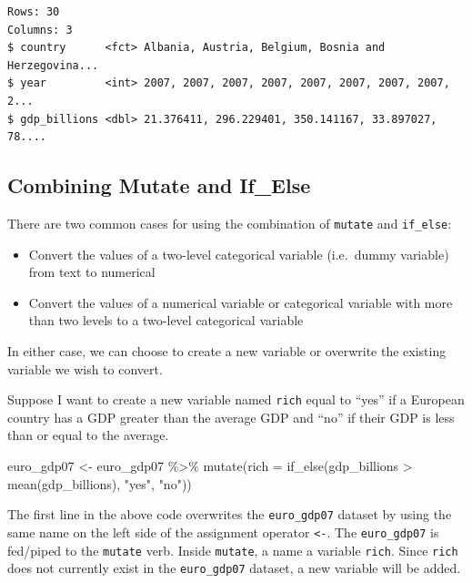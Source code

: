 \documentclass[
]{book}
\makeatletter
\newenvironment{Shaded}{\begin{snugshade}}{\end{snugshade}}
\newcommand{\AttributeTok}[1]{\textcolor[rgb]{0.61,0.61,0.61}{#1}}
\newcommand{\FunctionTok}[1]{\textcolor[rgb]{0,0,0}{#1}}
\newcommand{\NormalTok}[1]{#1}
\newcommand{\OtherTok}[1]{\textcolor[rgb]{0.37,0.37,0.37}{#1}}
\newcommand{\SpecialCharTok}[1]{\textcolor[rgb]{0,0,0}{#1}}
\newcommand{\StringTok}[1]{\textcolor[rgb]{0.5,0.5,0.5}{#1}}
\providecommand{\tightlist}{%
  \setlength{\itemsep}{0pt}\setlength{\parskip}{0pt}}
\newenvironment{kframe}{%
\medskip{}
\setlength{\fboxsep}{.8em}
 \def\at@end@of@kframe{}%
 \ifinner\ifhmode%
  \def\at@end@of@kframe{\end{minipage}}%
  \begin{minipage}{\columnwidth}%
 \fi\fi%
 \def\FrameCommand##1{\hskip\@totalleftmargin \hskip-\fboxsep
 \colorbox{shadecolor}{##1}\hskip-\fboxsep
     \hskip-\linewidth \hskip-\@totalleftmargin \hskip\columnwidth}%
 \MakeFramed {\advance\hsize-\width
   \@totalleftmargin\z@ \linewidth\hsize
   \@setminipage}}%
 {\par\unskip\endMakeFramed%
 \at@end@of@kframe}
\renewenvironment{Shaded}{\begin{kframe}}{\end{kframe}}
\makeatother
\begin{document}
\begin{verbatim}
Rows: 30
Columns: 3
$ country      <fct> Albania, Austria, Belgium, Bosnia and Herzegovina...
$ year         <int> 2007, 2007, 2007, 2007, 2007, 2007, 2007, 2007, 2...
$ gdp_billions <dbl> 21.376411, 296.229401, 350.141167, 33.897027, 78....
\end{verbatim}

\hypertarget{combining-mutate-and-if_else}{%
\subsection{Combining Mutate and If\_Else}\label{combining-mutate-and-if_else}}

There are two common cases for using the combination of \texttt{mutate} and \texttt{if\_else}:

\begin{itemize}
\tightlist
\item
  Convert the values of a two-level categorical variable (i.e.~dummy variable) from text to numerical
\item
  Convert the values of a numerical variable or categorical variable with more than two levels to a two-level categorical variable
\end{itemize}

In either case, we can choose to create a new variable or overwrite the existing variable we wish to convert.

Suppose I want to create a new variable named \texttt{rich} equal to ``yes'' if a European country has a GDP greater than the average GDP and ``no'' if their GDP is less than or equal to the average.

\begin{Shaded}
\begin{Highlighting}[]
\NormalTok{euro\_gdp07 }\OtherTok{\textless{}{-}}\NormalTok{ euro\_gdp07 }\SpecialCharTok{\%\textgreater{}\%} 
  \FunctionTok{mutate}\NormalTok{(}\AttributeTok{rich =} \FunctionTok{if\_else}\NormalTok{(gdp\_billions }\SpecialCharTok{\textgreater{}} \FunctionTok{mean}\NormalTok{(gdp\_billions), }\StringTok{"yes"}\NormalTok{, }\StringTok{"no"}\NormalTok{))}
\end{Highlighting}
\end{Shaded}

The first line in the above code overwrites the \texttt{euro\_gdp07} dataset by using the same name on the left side of the assignment operator \texttt{\textless{}-}. The \texttt{euro\_gdp07} is fed/piped to the \texttt{mutate} verb. Inside \texttt{mutate}, a name a variable \texttt{rich}. Since \texttt{rich} does not currently exist in the \texttt{euro\_gdp07} dataset, a new variable will be added.
\end{document}
